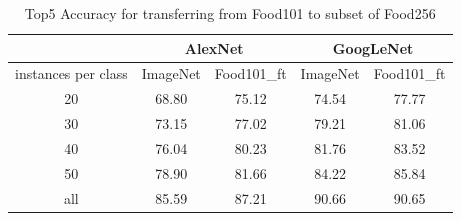 \begin{table}[htbp]
  \centering
  \caption{Top5 Accuracy for transferring from Food101 to subset of Food256}
    \begin{tabular}{c|cc|cc}
    \toprule
          & \multicolumn{2}{c|}{AlexNet} & \multicolumn{2}{c}{GoogLeNet} \\
    \midrule
    instances per class & ImageNet  & Food101\_ft    &  ImageNet  & Food101\_ft \\ \midrule
    20    & 68.80  & {75.12} & 74.54 & {77.77} \\
    30    & 73.15 & {77.02} & 79.21 & {81.06} \\
    40    & 76.04 & {80.23} & 81.76 & {83.52} \\
    50    & 78.90  & {81.66} & 84.22 & {85.84} \\
    all    & 85.59 &  {87.21} & {90.66 }&   {90.65}     \\
    \bottomrule
    \end{tabular}%
  \label{tab:cross}%
\end{table}%

